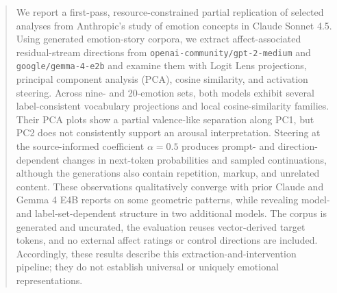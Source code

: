 \begin{abstract}

We report a first-pass, resource-constrained partial replication of selected analyses from Anthropic's study of emotion 
concepts in Claude Sonnet 4.5. Using generated emotion-story corpora, we extract affect-associated residual-stream 
directions from \texttt{openai-community/gpt-2-medium} and \texttt{google/gemma-4-e2b} and examine them with Logit 
Lens projections, principal component analysis (PCA), cosine similarity, and activation steering. Across nine- and 
20-emotion sets, both models exhibit several label-consistent vocabulary projections and local cosine-similarity families. 
Their PCA plots show a partial valence-like separation along PC1, but PC2 does not consistently support an arousal interpretation. 
Steering at the source-informed coefficient $\alpha=0.5$ produces prompt- and direction-dependent changes in next-token probabilities 
and sampled continuations, although the generations also contain repetition, markup, and unrelated content. These observations 
qualitatively converge with prior Claude and Gemma 4 E4B reports on some geometric patterns, while revealing model- and 
label-set-dependent structure in two additional models. The corpus is generated and uncurated, the evaluation reuses 
vector-derived target tokens, and no external affect 
ratings or control directions are included. Accordingly, these results describe this extraction-and-intervention pipeline; 
they do not establish universal or uniquely emotional representations.

\end{abstract}
